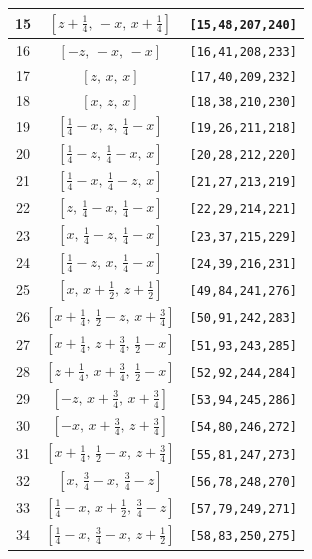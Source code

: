 \documentclass[fleqn,8pt]{jsarticle}
\begin{document}
\begin{longtable}{ccc}
15 & $\left[ z + \frac{1}{4},\, - x,\, x + \frac{1}{4} \right]$ & {\tt [15,48,207,240]} \\ \hline
16 & $\left[ - z,\, - x,\, - x \right]$ & {\tt [16,41,208,233]} \\ \hline
17 & $\left[ z,\, x,\, x \right]$ & {\tt [17,40,209,232]} \\ \hline
18 & $\left[ x,\, z,\, x \right]$ & {\tt [18,38,210,230]} \\ \hline
19 & $\left[ \frac{1}{4} - x,\, z,\, \frac{1}{4} - x \right]$ & {\tt [19,26,211,218]} \\ \hline
20 & $\left[ \frac{1}{4} - z,\, \frac{1}{4} - x,\, x \right]$ & {\tt [20,28,212,220]} \\ \hline
21 & $\left[ \frac{1}{4} - x,\, \frac{1}{4} - z,\, x \right]$ & {\tt [21,27,213,219]} \\ \hline
22 & $\left[ z,\, \frac{1}{4} - x,\, \frac{1}{4} - x \right]$ & {\tt [22,29,214,221]} \\ \hline
23 & $\left[ x,\, \frac{1}{4} - z,\, \frac{1}{4} - x \right]$ & {\tt [23,37,215,229]} \\ \hline
24 & $\left[ \frac{1}{4} - z,\, x,\, \frac{1}{4} - x \right]$ & {\tt [24,39,216,231]} \\ \hline
25 & $\left[ x,\, x + \frac{1}{2},\, z + \frac{1}{2} \right]$ & {\tt [49,84,241,276]} \\ \hline
26 & $\left[ x + \frac{1}{4},\, \frac{1}{2} - z,\, x + \frac{3}{4} \right]$ & {\tt [50,91,242,283]} \\ \hline
27 & $\left[ x + \frac{1}{4},\, z + \frac{3}{4},\, \frac{1}{2} - x \right]$ & {\tt [51,93,243,285]} \\ \hline
28 & $\left[ z + \frac{1}{4},\, x + \frac{3}{4},\, \frac{1}{2} - x \right]$ & {\tt [52,92,244,284]} \\ \hline
29 & $\left[ - z,\, x + \frac{3}{4},\, x + \frac{3}{4} \right]$ & {\tt [53,94,245,286]} \\ \hline
30 & $\left[ - x,\, x + \frac{3}{4},\, z + \frac{3}{4} \right]$ & {\tt [54,80,246,272]} \\ \hline
31 & $\left[ x + \frac{1}{4},\, \frac{1}{2} - x,\, z + \frac{3}{4} \right]$ & {\tt [55,81,247,273]} \\ \hline
32 & $\left[ x,\, \frac{3}{4} - x,\, \frac{3}{4} - z \right]$ & {\tt [56,78,248,270]} \\ \hline
33 & $\left[ \frac{1}{4} - x,\, x + \frac{1}{2},\, \frac{3}{4} - z \right]$ & {\tt [57,79,249,271]} \\ \hline
34 & $\left[ \frac{1}{4} - x,\, \frac{3}{4} - x,\, z + \frac{1}{2} \right]$ & {\tt [58,83,250,275]} \\ \hline

\end{longtable}
\end{document}

